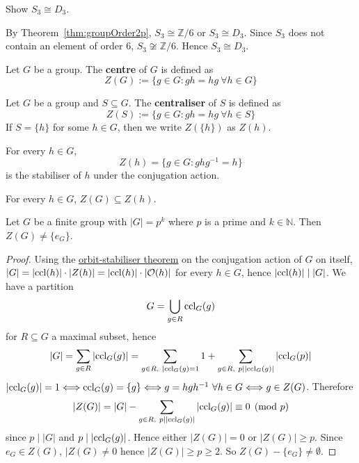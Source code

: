 \begin{example}
	Show $S_3 \cong D_3$.

	By Theorem~\ref{thm:groupOrder2p}, $S_3 \cong \mathbb{Z} / 6$ or $S_3 \cong D_3$. Since $S_3$ does not contain an element of order $6$, $S_3 \not\cong \mathbb{Z} / 6$. Hence $S_3 \cong D_3$.
\end{example}

\begin{definition}
	Let $G$ be a group. The \textbf{centre} of $G$ is defined as
	\[
		Z(G) := \{ g \in G: gh = hg \ \forall h \in G \}
	\]
\end{definition}

\begin{definition}
	Let $G$ be a group and $S \subseteq G$. The \textbf{centraliser} of $S$ is defined as
	\[
		Z(S) := \{ g \in G: gh = hg \ \forall h \in S \}
	\]
	If $S = \{ h \}$ for some $h \in G$, then we write $Z(\{ h \})$ as $Z(h)$.
\end{definition}

\begin{remark}
	For every $h \in G$,
	\[
		Z(h) = \{ g \in G: ghg^{-1} = h \}
	\]
	is the stabiliser of $h$ under the conjugation action.
\end{remark}

\begin{remark}
	For every $h \in G$, $Z(G) \subseteq Z(h)$.
\end{remark}

\begin{proposition}\label{prop:primePowerGroupOrderHasNonTrivialCentre}
	Let $G$ be a finite group with $|G| = p^k$ where $p$ is a prime and $k \in \mathbb{N}$. Then $Z(G) \ne \{ e_G \}$.
\end{proposition}

\begin{proof}
	Using the \hyperref[thm:orbitStabiliser]{orbit-stabiliser theorem} on the conjugation action of $G$ on itself, $|G| = |\text{ccl}(h)| \cdot |Z(h)| = |\text{ccl}(h)| \cdot |\mathcal{O}(h)|$ for every $h \in G$, hence $|\text{ccl}(h)| \mid |G|$. We have a partition
	\[
		G = \bigcup_{g \in R} \text{ccl}_G(g)
	\]
	for $R \subseteq G$ a maximal subset, hence
	\[
		|G| = \sum_{g \in R} |\text{ccl}_G(g)| = \sum_{g \in R, \ |\text{ccl}_G(g) = 1} 1 + \sum_{g \in R, \ p \mid |\text{ccl}_G(g)|} |\text{ccl}_G(p)|
	\]
	$|\text{ccl}_G(g)| = 1 \Longleftrightarrow \text{ccl}_G(g) = \{ g \} \Longleftrightarrow g = hgh^{-1} \ \forall h \in G \Longleftrightarrow g \in Z(G)$. Therefore
	\[
		|Z(G)| = |G| - \sum_{g \in R, \ p \mid |\text{ccl}_G(g)|} |\text{ccl}_G(g)| \equiv 0 \pmod{p}
	\]
	since $p \mid |G|$ and $p \mid |\text{ccl}_G(g)|$. Hence either $|Z(G)| = 0$ or $|Z(G)| \ge p$. Since $e_G \in Z(G)$, $|Z(G) \ne 0$ hence $|Z(G)| \ge p \ge 2$. So $Z(G) - \{ e_G \} \ne \emptyset$.
\end{proof}

